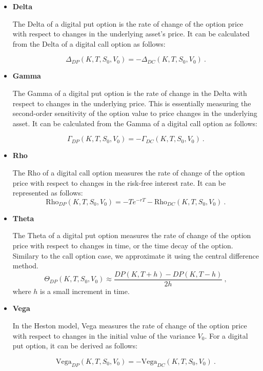 \begin{itemize}

\item \textbf{Delta} 

The Delta of a digital put option is the rate of change of the option price with respect to changes in the underlying asset's price. It can be calculated from the Delta of a digital call option as follows:

$$
\Delta_{DP}(K,T,S_0,V_0) = -\Delta_{DC}(K,T,S_0,V_0) \ .
$$

\item \textbf{Gamma} 

The Gamma of a digital put option is the rate of change in the Delta with respect to changes in the underlying price. This is essentially measuring the second-order sensitivity of the option value to price changes in the underlying asset. It can be calculated from the Gamma of a digital call option as follows:

$$
\Gamma_{DP}(K,T,S_0,V_0) = -\Gamma_{DC}(K,T,S_0,V_0) \ .
$$



\item \textbf{Rho} 

The Rho of a digital call option measures the rate of change of the option price with respect to changes in the risk-free interest rate. It can be represented as follows:
$$
\text{Rho}_{DP}(K,T,S_0,V_0) = 
-Te^{-rT} - \text{Rho}_{DC}(K,T,S_0,V_0) \ .
$$


\item \textbf{Theta} 

The Theta of a digital put option measures the rate of change of the option price with respect to changes in time, or the time decay of the option. Similary to the call option case, we approximate it using the central difference method. 
$$
 \Theta_{DP}(K,T,S_0,V_0) \approx \frac{DP(K,T+h) - DP(K,T-h)}{2h} \ ,
$$
where $h$ is a small increment in time. 

\item \textbf{Vega} 

In the Heston model, Vega measures the rate of change of the option price with respect to changes in the initial value of the variance $V_0$. For a digital put option, it can be derived as follows:

$$
\text{Vega}_{DP}(K,T,S_0,V_0) = - \text{Vega}_{DC}(K,T,S_0,V_0) \ .
$$






\end{itemize}







